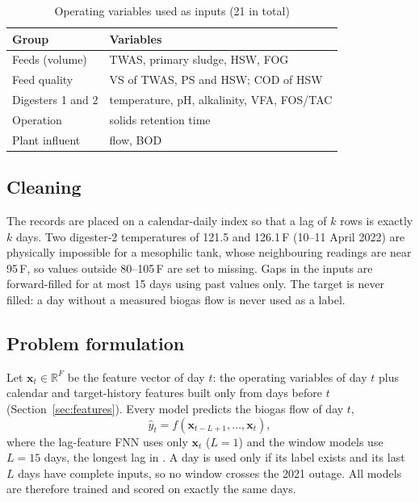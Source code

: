 \documentclass[conference]{IEEEtran}
\begin{document}
\begin{table}[!t]
\centering
\caption{Operating variables used as inputs (21 in total)}
\label{tab:vars}
\begin{tabular}{@{}ll@{}}
\toprule
Group & Variables \\
\midrule
Feeds (volume) & TWAS, primary sludge, HSW, FOG \\
Feed quality & VS of TWAS, PS and HSW; COD of HSW \\
Digesters 1 and 2 & temperature, pH, alkalinity, VFA, FOS/TAC \\
Operation & solids retention time \\
Plant influent & flow, BOD \\
\bottomrule
\end{tabular}
\end{table}

\subsection{Cleaning}
The records are placed on a calendar-daily index so that a lag of $k$ rows is exactly $k$
days. Two digester-2 temperatures of 121.5 and 126.1\,\textdegree F (10--11 April 2022) are
physically impossible for a mesophilic tank, whose neighbouring readings are near
95\,\textdegree F, so values outside 80--105\,\textdegree F are set to missing. Gaps in the
inputs are forward-filled for at most 15 days using past values only. The target is never
filled: a day without a measured biogas flow is never used as a label.

\subsection{Problem formulation}
Let $\mathbf{x}_t\in\mathbb{R}^{F}$ be the feature vector of day $t$: the operating variables
of day $t$ plus calendar and target-history features built only from days before $t$
(Section~\ref{sec:features}). Every model predicts the biogas flow of day $t$,
\begin{equation}
\hat{y}_t = f\left(\mathbf{x}_{t-L+1},\dots,\mathbf{x}_t\right),
\end{equation}
where the lag-feature FNN uses only $\mathbf{x}_t$ ($L=1$) and the window models use $L=15$
days, the longest lag in \cite{long2026}. A day is used only if its label exists and its
last $L$ days have complete inputs, so no window crosses the 2021 outage. All models are
therefore trained and scored on exactly the same days.
\end{document}
